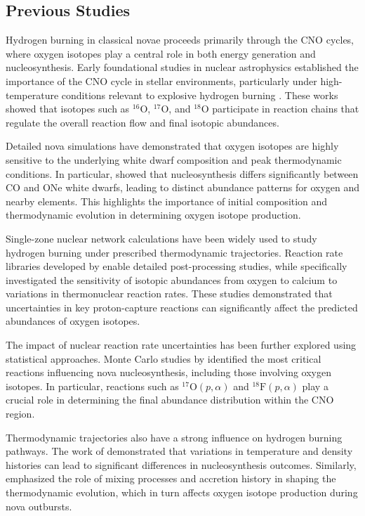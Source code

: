 \subsection{Previous Studies }


Hydrogen burning in classical novae proceeds primarily through the CNO cycles, where oxygen isotopes play a central role in both energy generation and nucleosynthesis. Early foundational studies in nuclear astrophysics established the importance of the CNO cycle in stellar environments, particularly under high-temperature conditions relevant to explosive hydrogen burning \cite{RolfsRodney1988,Adelberger2011}. These works showed that isotopes such as $^{16}\mathrm{O}$, $^{17}\mathrm{O}$, and $^{18}\mathrm{O}$ participate in reaction chains that regulate the overall reaction flow and final isotopic abundances.

Detailed nova simulations have demonstrated that oxygen isotopes are highly sensitive to the underlying white dwarf composition and peak thermodynamic conditions. In particular, \cite{JoseHernanz1998} showed that nucleosynthesis differs significantly between CO and ONe white dwarfs, leading to distinct abundance patterns for oxygen and nearby elements. This highlights the importance of initial composition and thermodynamic evolution in determining oxygen isotope production.

Single-zone nuclear network calculations have been widely used to study hydrogen burning under prescribed thermodynamic trajectories. Reaction rate libraries developed by \cite{Iliadis2002} enable detailed post-processing studies, while \cite{Iliadis2001} specifically investigated the sensitivity of isotopic abundances from oxygen to calcium to variations in thermonuclear reaction rates. These studies demonstrated that uncertainties in key proton-capture reactions can significantly affect the predicted abundances of oxygen isotopes.

The impact of nuclear reaction rate uncertainties has been further explored using statistical approaches. Monte Carlo studies by \cite{Parikh2013,Parikh2014} identified the most critical reactions influencing nova nucleosynthesis, including those involving oxygen isotopes. In particular, reactions such as $^{17}\mathrm{O}(p,\alpha)$ and $^{18}\mathrm{F}(p,\alpha)$ play a crucial role in determining the final abundance distribution within the CNO region.

Thermodynamic trajectories also have a strong influence on hydrogen burning pathways. The work of \cite{Downen2013} demonstrated that variations in temperature and density histories can lead to significant differences in nucleosynthesis outcomes. Similarly, \cite{Denissenkov2014} emphasized the role of mixing processes and accretion history in shaping the thermodynamic evolution, which in turn affects oxygen isotope production during nova outbursts.

